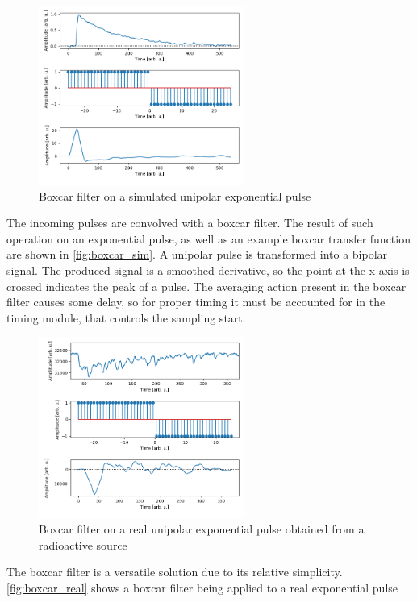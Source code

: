 \documentclass[a4paper,12pt,table]{article}
\begin{document}
		\begin{figure}[!ht]
			\centering
			\includegraphics[width=0.60\textwidth]{img/boxcar_sim.png}
			\caption{Boxcar filter on a simulated unipolar exponential pulse}\label{fig:boxcar_sim}
		\end{figure}
		The incoming pulses are convolved with a boxcar filter. The result of such operation on 
		an exponential pulse, as well as an example boxcar transfer function are shown in \autoref{fig:boxcar_sim}.
		A unipolar pulse is transformed into a bipolar signal. The produced signal is a smoothed derivative, 
		so the point at the x-axis is crossed indicates the peak of a pulse.
		The averaging action present in the boxcar filter causes some delay, so for proper timing
		it must be accounted for in the timing module, that controls the sampling start.
		\newpage
		\begin{figure}[!h]
			\centering
			\includegraphics[width=0.60\textwidth]{img/boxcar_real.png}
			\caption{Boxcar filter on a real unipolar exponential pulse obtained from a radioactive source}\label{fig:boxcar_real}
		\end{figure}
		The boxcar filter is a versatile solution due to its relative simplicity. 
		\autoref{fig:boxcar_real} shows a boxcar filter being applied to a real exponential pulse
\end{document}
